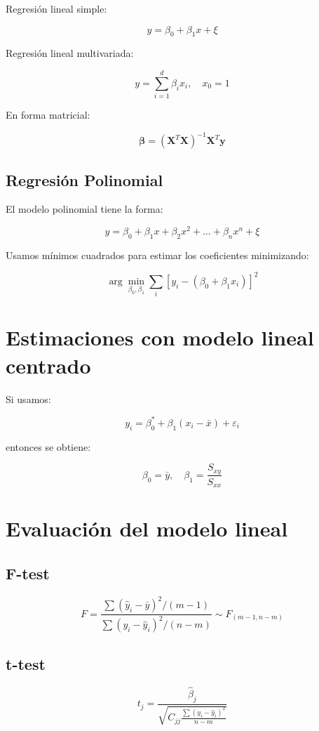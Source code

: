 \documentclass[12pt]{article}
\begin{document}
Regresión lineal simple:

\[
y = \beta_0 + \beta_1 x + \xi
\]

Regresión lineal multivariada:

\[
y = \sum_{i=1}^{d} \beta_i x_i, \quad x_0 = 1
\]

En forma matricial:

\[
\bm{\beta} = (\bm{X}^T \bm{X})^{-1} \bm{X}^T \bm{y}
\]

\subsection{Regresión Polinomial}

El modelo polinomial tiene la forma:

\[
y = \beta_0 + \beta_1 x + \beta_2 x^2 + \dots + \beta_n x^n + \xi
\]

Usamos mínimos cuadrados para estimar los coeficientes minimizando:

\[
\arg\min_{\beta_0, \beta_1} \sum_i \left[y_i - (\beta_0 + \beta_1 x_i)\right]^2
\]

\section{Estimaciones con modelo lineal centrado}

Si usamos:

\[
y_i = \beta_0^* + \beta_1 (x_i - \bar{x}) + \varepsilon_i
\]

entonces se obtiene:

\[
\beta_0 = \bar{y}, \quad \beta_1 = \frac{S_{xy}}{S_{xx}}
\]

\section{Evaluación del modelo lineal}

\subsection{F-test}

\[
F = \frac{\sum (\hat{y}_i - \bar{y})^2 / (m-1)}{\sum (y_i - \hat{y}_i)^2 / (n - m)} \sim F_{(m-1, n-m)}
\]

\subsection{t-test}

\[
t_j = \frac{\hat{\beta}_j}{\sqrt{C_{jj} \frac{\sum (y_i - \hat{y}_i)^2}{n - m}}}
\]
\end{document}
